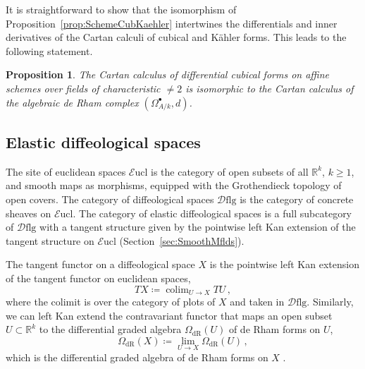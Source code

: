 \documentclass[12pt,reqno, a4paper]{amsart}
\numberwithin{equation}{section}
\theoremstyle{plain}
\newtheorem{Proposition}[Theorem]{Proposition}
\theoremstyle{definition}
\theoremstyle{remark}
\DeclareMathOperator*{\Lim}{lim}
\DeclareMathOperator*{\Colim}{colim}
\newcommand{\bbR}{\mathbb{R}}
\newcommand{\Eucl}{{\mathcal{E}\mathrm{ucl}}}
\newcommand{\Dflg}{{\mathcal{D}\mathrm{flg}}}
\begin{document}
It is straightforward to show that the isomorphism of Proposition~\ref{prop:SchemeCubKaehler} intertwines the differentials and inner derivatives of the Cartan calculi of cubical and K\"ahler forms. This leads to the following statement.

\begin{Proposition}
\label{prop:SchemeCubCartan}
The Cartan calculus of differential cubical forms on affine schemes over fields of characteristic $\neq 2$ is isomorphic to the Cartan calculus of the algebraic de Rham complex $(\Omega^\bullet_{A/k}, d)$.
\end{Proposition}



\subsection{Elastic diffeological spaces}
\label{sec:Elastic}

The site of euclidean spaces $\Eucl$ is the category of open subsets of all $\bbR^k$, $k \geq 1$, and smooth maps as morphisms, equipped with the Grothendieck topology of open covers. The category of diffeological spaces $\Dflg$ is the category of concrete sheaves on $\Eucl$. The category of elastic diffeological spaces \cite{Blohmann:2024a} is a full subcategory of $\Dflg$ with a tangent structure given by the pointwise left Kan extension of the tangent structure on $\Eucl$ (Section~\ref{sec:SmoothMflds}).

The tangent functor on a diffeological space $X$ is the pointwise left Kan extension of the tangent functor on euclidean spaces,
\begin{equation*}
  TX \coloneqq \Colim_{U \to X} TU
  \,,
\end{equation*}
where the colimit is over the category of plots of $X$ and taken in $\Dflg$. Similarly, we can left Kan extend the contravariant functor that maps an open subset $U \subset \bbR^k$ to the differential graded algebra $\Omega_\mathrm{dR}(U)$ of de Rham forms on $U$,
\begin{equation*}
  \Omega_\mathrm{dR}(X) \coloneqq \Lim_{U \to X} \Omega_\mathrm{dR}(U)
  \,,
\end{equation*}
which is the differential graded algebra of de Rham forms on $X$ \cite[\S 6.28]{IglesiasZemmour:2013}.
\end{document}
